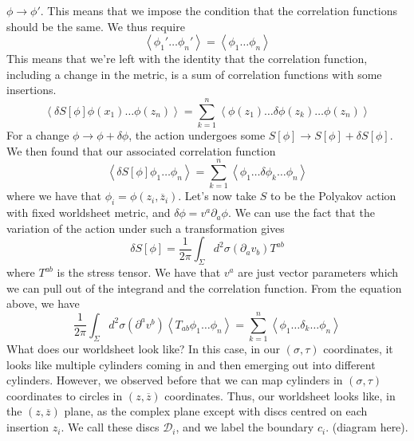 \documentclass[11pt, oneside]{article}   	%
\theoremstyle{slanted}
\begin{document}
$ \phi \to \phi  '  $. 
This means that we impose 
the condition that the correlation 
functions should be the same. 
We thus require
\[
  \left< \phi _ 1 ' \dots \phi _ n  '  \right> 
= \left< \phi _ 1 \dots \phi _ n  \right> 
\]
This means that we're 
left with the identity that 
the correlation function, including a change in 
the metric, is a sum of correlation 
functions with some insertions. 
\[
 \left< \delta S \left[  \phi  \right]  \phi 
 \left( x_1  \right)  \dots \phi \left( z _ n  \right)  \right>  = 
 \sum _{  k = 1 } ^ n \left< \phi \left( z_1  \right)  \dots \delta 
 \phi \left( z _ k  \right)  \dots \phi \left( z _ n  \right) \right> 
\] 
For a change $ \phi \to \phi + \delta \phi $, 
the action undergoes some $ S \left[  \phi  \right]  
\to S \left[  \phi  \right]  + \delta S \left[  \phi  \right]  $. 
We then found that 
our associated correlation function 
\[
 \left< \delta S \left[  \phi  \right]  
 \phi _ 1 \dots \phi _ n \right>  = \sum_{ k = 1 } ^ n 
 \left< \phi _ 1 \dots \delta \phi _ k \dots \phi _ n   \right> 
\] where we have that $ \phi _ i  = \phi \left( z_ i , 
\overline{ z } _ i \right)  $. 
Let's now take $ S $ to be the Polyakov 
action with fixed worldsheet metric, and 
$ \delta \phi  = v ^ a \partial  _ a \phi $. 
We can use the fact that the 
variation of the action 
under such a transformation 
gives 
\[
 \delta S  \left[ \phi  \right]  = \frac{1}{2 \pi } 
 \int_{ \Sigma } d ^ 2 \sigma \left( \partial  _ a v _ b  \right) T ^{ ab }  
\] where $ T ^{ ab } $ is the stress tensor. 
We have that $ v ^ a $ are just 
vector parameters which we can 
pull out of the integrand and the 
correlation function. 
From the equation above, we have 
\[
 \frac{1}{2 \pi }  
 \int_{ \Sigma } d ^ 2 \sigma \left( 
 \partial  ^ a v ^ b \right)  \left< T _{ ab }
 \phi _ 1 \dots \phi _ n \right>  = \sum _{ k =  1 } ^ n 
 \left< \phi _ 1 \dots \delta _  k \dots \phi _ n  \right> 
\] What does our worldsheet look like? 
In this case, in our $ \left( \sigma, \tau  \right)  $ 
coordinates, it looks like multiple cylinders 
coming in and then emerging out into different cylinders. 
However, we observed before that we can 
map cylinders in $ \left( \sigma, \tau  \right)  $ 
coordinates to circles in $ \left( z, \overline{ z}  \right) $ coordinates. 
Thus, our worldsheet looks like, in the $ \left( z, \overline{ z }   \right)  $ plane, 
as the complex plane except with discs centred on 
each insertion $ z _ i   $. We call these discs 
$ \mathcal{ D }_ i $, and we label the boundary 
$ c _ i $. 
(diagram here). 
\end{document}
